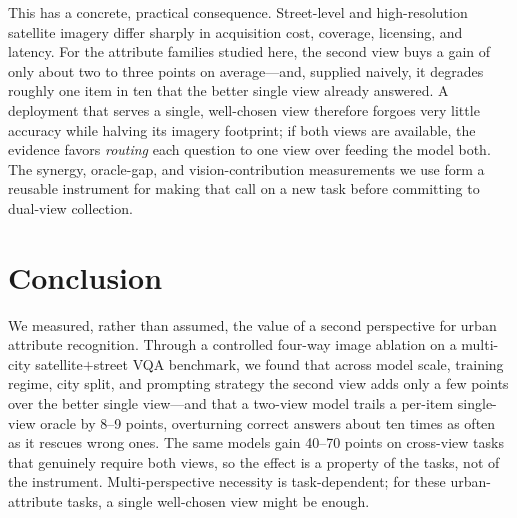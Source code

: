 \documentclass[runningheads]{llncs}
\begin{document}
This has a concrete, practical consequence. Street-level and high-resolution
satellite imagery differ sharply in acquisition cost, coverage, licensing, and
latency. For the attribute families studied here, the second view buys a gain of
only about two to three points on average---and, supplied naively, it degrades
roughly one item in ten that the better single view already answered. A
deployment that serves a single, well-chosen view therefore forgoes very little
accuracy while halving its imagery footprint; if both views are available, the
evidence favors \emph{routing} each question to one view over feeding the model
both. The synergy, oracle-gap, and vision-contribution measurements we use form a
reusable instrument for making that call on a new task before committing to
dual-view collection.

\section{Conclusion}
\label{sec:conclusion}

We measured, rather than assumed, the value of a second perspective for urban
attribute recognition. Through a controlled four-way image ablation on a
multi-city satellite$+$street VQA benchmark, we found that across model scale,
training regime, city split, and prompting strategy the second view adds only a
few points over the better single view---and that a two-view model trails a
per-item single-view oracle by \num{8}--\num{9} points, overturning correct
answers about ten times as often as it rescues wrong ones. The same models gain
\num{40}--\num{70} points on cross-view tasks that genuinely require both views,
so the effect is a property of the tasks, not of the instrument. Multi-perspective
necessity is task-dependent; for these urban-attribute tasks, a single
well-chosen view might be enough.

\clearpage




\end{document}
